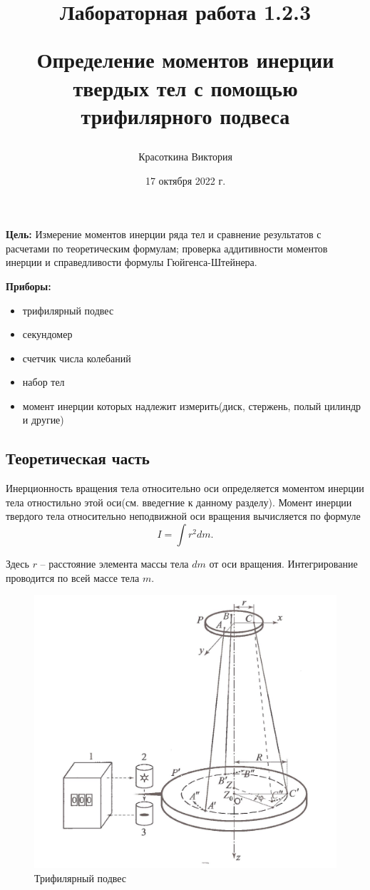 \documentclass[a4paper,12pt]{article}
\author{Красоткина Виктория}
\title{Лабораторная работа 1.2.3

Определение моментов инерции твердых тел с помощью трифилярного подвеса}
\date{17 октября 2022 г.}
\begin{document}
\maketitle
\thispagestyle{empty}

\newpage
\setcounter{page}{1}


\textbf{Цель:}
Измерение моментов инерции ряда тел и сравнение результатов с расчетами по теоретическим формулам; проверка аддитивности моментов инерции и справедливости формулы Гюйгенса-Штейнера.

\textbf{Приборы:}
\begin{itemize}
	\item трифилярный подвес
	\item секундомер
	\item счетчик числа колебаний
	\item набор тел
	\item момент инерции которых надлежит измерить(диск, стержень, полый цилиндр и другие)
\end{itemize}

\subsection*{Теоретическая часть}

Инерционность вращения тела относительно оси определяется моментом инерции тела отностильно этой оси(см. введегние к данному разделу). Момент инерции твердого тела относительно неподвижной оси вращения вычисляется по формуле 
\[ I = \int r^2 dm .\]

Здесь $r$ -- расстояние элемента массы тела $dm$ от оси вращения. Интегрирование проводится по всей массе тела $m$. 

\begin{figure}[h]
	\centering
	\includegraphics[scale=0.3]{schem_device}
	\caption{Трифилярный подвес}
	\label{ris1}
\end{figure}
\end{document}
